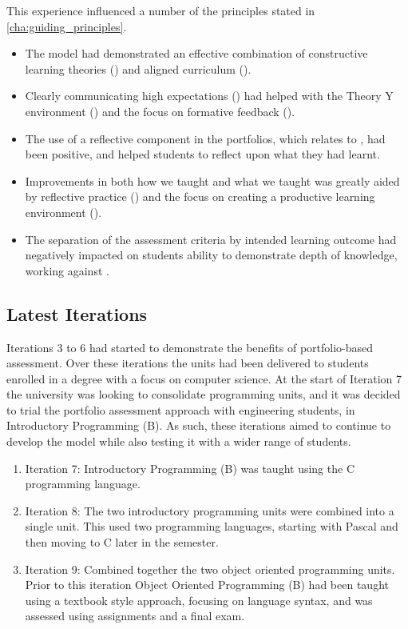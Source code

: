 This experience influenced a number of the principles stated in \cref{cha:guiding_principles}. 

\begin{itemize}[noitemsep,nolistsep]
	\item The model had demonstrated an effective combination of constructive learning theories () and aligned curriculum ().
	\item Clearly communicating high expectations () had helped with the Theory Y environment () and the focus on formative feedback ().
	\item The use of a reflective component in the portfolios, which relates to , had been positive, and helped students to reflect upon what they had learnt.
	\item Improvements in both how we taught and what we taught was greatly aided by reflective practice () and the focus on creating a productive learning environment ().
	\item The separation of the assessment criteria by intended learning outcome had negatively impacted on students ability to demonstrate depth of knowledge, working against .
\end{itemize}





\subsection{Latest Iterations} %
\label{sub:latest_iterations}

Iterations 3 to 6 had started to demonstrate the benefits of portfolio-based assessment. Over these iterations the units had been delivered to students enrolled in a degree with a focus on computer science. At the start of Iteration 7 the university was looking to consolidate programming units, and it was decided to trial the portfolio assessment approach with engineering students, in Introductory Programming (B). As such, these iterations aimed to continue to develop the model while also testing it with a wider range of students.

\begin{enumerate}
	\item Iteration 7: Introductory Programming (B) was taught using the C programming language.
	\item Iteration 8: The two introductory programming units were combined into a single unit. This used two programming languages, starting with Pascal and then moving to C later in the semester.
	\item Iteration 9: Combined together the two object oriented programming units. Prior to this iteration Object Oriented Programming (B) had been taught using a textbook style approach, focusing on language syntax, and was assessed using assignments and a final exam.
\end{enumerate}

